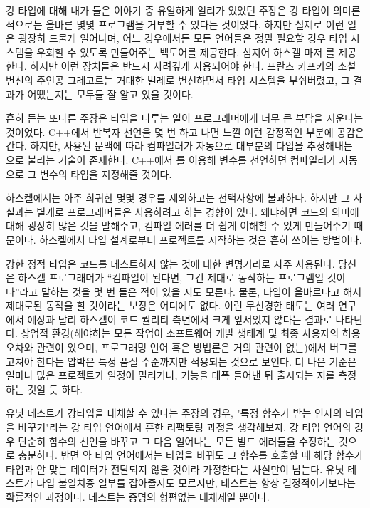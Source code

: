 강 타입에 대해 내가 들은 이야기 중 유일하게 일리가 있었던 주장은 강 타입이 의미론적으로는 올바른 몇몇 프로그램을 거부할 수 있다는 것이었다.
하지만 실제로 이런 일은 굉장히 드물게 일어나며, 어느 경우에서든 모든 언어들은 정말 필요할 경우 타입 시스템을 우회할 수 있도록 만들어주는 백도어를 제공한다.
심지어 하스켈 마저 를 제공한다. 하지만 이런 장치들은 반드시 사려깊게 사용되어야 한다.
프란츠 카프카의 소설 변신의 주인공 그레고르는 거대한 벌레로 변신하면서 타입 시스템을 부숴버렸고, 그 결과가 어땠는지는 모두들 잘 알고 있을 것이다.

흔히 듣는 또다른 주장은 타입을 다루는 일이 프로그래머에게 너무 큰 부담을 지운다는 것이었다. 
C++에서 반복자 선언을 몇 번 하고 나면 느낄 이런 감정적인 부분에 공감은 간다.
하지만, 사용된 문맥에 따라 컴파일러가 자동으로 대부분의 타입을 추정해내는 \newterm{\trTypeInference}으로 불리는 기술이 존재한다.
C++에서 를 이용해 변수를 선언하면 컴파일러가 자동으로 그 변수의 타입을 지정해줄 것이다.

하스켈에서는 아주 희귀한 몇몇 경우를 제외하고는 \trTypeAnnotation\은 선택사항에 불과하다.
하지만 그 사실과는 별개로 프로그래머들은 \trTypeAnnotation\을 사용하려고 하는 경향이 있다.
왜냐하면 \trTypeAnnotation\은 코드의 의미에 대해 굉장히 많은 것을 말해주고, 컴파일 에러를 더 쉽게 이해할 수 있게 만들어주기 때문이다.
하스켈에서 타입 설계로부터 프로젝트를 시작하는 것은 흔히 쓰이는 방법이다. 

강한 정적 타입은 코드를 테스트하지 않는 것에 대한 변명거리로 자주 사용된다.
당신은 하스켈 프로그래머가 ``컴파일이 된다면, 그건 제대로 동작하는 프로그램일 것이다''라고 말하는 것을 몇 번 들은 적이 있을 지도 모른다.
물론, 타입이 올바르다고 해서 제대로된 동작을 할 것이라는 보장은 어디에도 없다.
이런 무신경한 태도는 여러 연구에서 예상과 달리 하스켈이 코드 퀄리티 측면에서 크게 앞서있지 않다는 결과로 나타난다.
상업적 환경(해야하는 모든 작업이 소프트웨어 개발 생태계 및 최종 사용자의 허용 오차와 관련이 있으며, 프로그래밍 언어 혹은 방법론은 거의 관련이 없는)에서 버그를 고쳐야 한다는 압박은 특정 품질 수준까지만 적용되는 것으로 보인다.
더 나은 기준은 얼마나 많은 프로젝트가 일정이 밀리거나, 기능을 대폭 들어낸 뒤 출시되는 지를 측정하는 것일 듯 하다.

유닛 테스트가 강타입을 대체할 수 있다는 주장의 경우, "특정 함수가 받는 인자의 타입을 바꾸기"라는 강 타입 언어에서 흔한 리팩토링 과정을 생각해보자.
강 타입 언어의 경우 단순히 함수의 선언을 바꾸고 그 다음 일어나는 모든 빌드 에러들을 수정하는 것으로 충분하다.
반면 약 타입 언어에서는 타입을 바꿔도 그 함수를 호출할 때 해당 함수가 타입과 안 맞는 데이터가 전달되지 않을 것이라 가정한다는 사실만이 남는다.
유닛 테스트가 타입 불일치중 일부를 잡아줄지도 모르지만, 테스트는 항상 결정적이기보다는 확률적인 과정이다. 테스트는 증명의 형편없는 대체제일 뿐이다.


